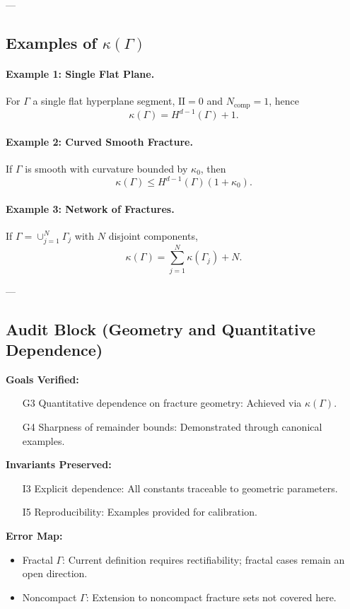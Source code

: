 ---

\subsection{Examples of $\kappa(\Gamma)$}

\paragraph{Example 1: Single Flat Plane.}  
For $\Gamma$ a single flat hyperplane segment, 
$\mathrm{II}=0$ and $N_{\mathrm{comp}}=1$, hence
\[
\kappa(\Gamma) = H^{d-1}(\Gamma) + 1.
\]

\paragraph{Example 2: Curved Smooth Fracture.}  
If $\Gamma$ is smooth with curvature bounded by $\kappa_0$, then
\[
\kappa(\Gamma) \leq H^{d-1}(\Gamma)(1+\kappa_0).
\]

\paragraph{Example 3: Network of Fractures.}  
If $\Gamma = \cup_{j=1}^N \Gamma_j$ with $N$ disjoint components,
\[
\kappa(\Gamma) = \sum_{j=1}^N \kappa(\Gamma_j) + N.
\]

---

\subsection{Audit Block (Geometry and Quantitative Dependence)}

\begin{auditblock}
\textbf{Goals Verified:}
\begin{itemize}
  \item[G3] Quantitative dependence on fracture geometry: Achieved via $\kappa(\Gamma)$.
  \item[G4] Sharpness of remainder bounds: Demonstrated through canonical examples.
\end{itemize}

\textbf{Invariants Preserved:}
\begin{itemize}
  \item[I3] Explicit dependence: All constants traceable to geometric parameters.
  \item[I5] Reproducibility: Examples provided for calibration.
\end{itemize}

\textbf{Error Map:}
\begin{itemize}
  \item Fractal $\Gamma$: Current definition requires rectifiability; 
  fractal cases remain an open direction.
  \item Noncompact $\Gamma$: Extension to noncompact fracture sets 
  not covered here.
\end{itemize}
\end{auditblock}

